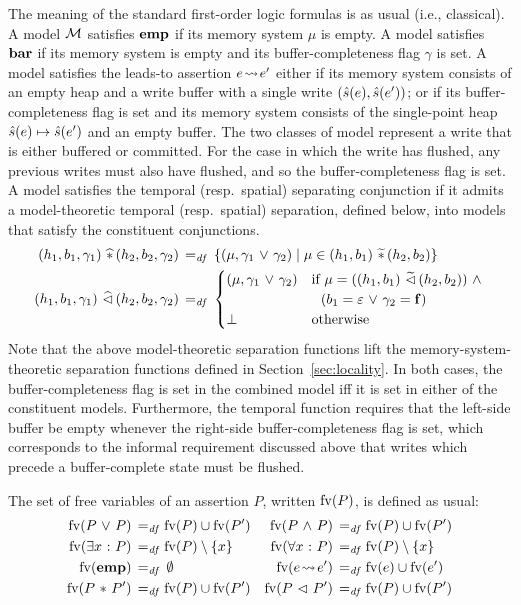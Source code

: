 \documentclass[11pt]{report}         %
\begin{document}
The meaning of the standard first-order logic formulas is as usual (i.e., classical). A model $\mathcal{M}$ satisfies $\mathbf{emp}$ if its memory system $\mu$ is empty. A model satisfies $\mathbf{bar}$ if its memory system is empty and its buffer-completeness flag $\gamma$ is set. A model satisfies the leads-to assertion $e \!\leadsto\! e'$ either if its memory system consists of an empty heap and a write buffer with a single write $(\hat{s}(e), \hat{s}(e'))$; or if its buffer-completeness flag is set and its memory system consists of the single-point heap $\hat{s}(e) \mapsto \hat{s}(e')$ and an empty buffer. The  two classes of model represent a write that is either buffered or committed. For the case in which the write has flushed, any previous writes must also have flushed, and so the buffer-completeness flag is set. A model satisfies the temporal (resp.\ spatial) separating conjunction if it admits a model-theoretic temporal (resp.\ spatial) separation, defined below, into models that satisfy the constituent conjunctions. 
\begin{align*}
  (h_1,b_1,\gamma_1) \operatorname{\,\widehat{\ast}\,} (h_2,b_2,\gamma_2) \operatorname{\;=_{\mathit{df}}\;} & \left\lbrace (\mu,\gamma_1 \operatorname{\,\vee\,} \gamma_2) \mid \mu \in (h_1,b_1) \operatorname{\,\widetilde{\ast}\,} (h_2,b_2) \right\rbrace \\ 
  (h_1,b_1,\gamma_1) \operatorname{\,\widehat{\vartriangleleft}\,} (h_2,b_2,\gamma_2) \operatorname{\;=_{\mathit{df}}\;} & \begin{cases}
  (\mu,\gamma_1 \operatorname{\,\vee\,} \gamma_2) & \text{if $\mu = ((h_1,b_1) \operatorname{\,\widetilde{\vartriangleleft}\,} (h_2,b_2)) \operatorname{\,\wedge\,}$} \\ 
  &  \text{~~$(b_1 = \varepsilon \operatorname{\,\vee\,} \gamma_2 = \mathbf{f})$} \\ 
  \bot & \text{otherwise}
  \end{cases}
\end{align*}
Note that the above model-theoretic separation functions lift the memory-system-theoretic separation functions defined in Section~\ref{sec:locality}. In both cases, the buffer-completeness flag is set in the combined model iff it is set in either of the constituent models. Furthermore, the temporal function requires that the left-side buffer be empty whenever the right-side buffer-completeness flag is set, which corresponds to the informal requirement discussed above that writes which precede a buffer-complete state must be flushed. 


The set of free variables of an assertion $P$, written $\mathrm{fv}(P)$, is defined as usual: \begin{align*}
    \mathrm{fv}(P \operatorname{\,\vee\,} P) \operatorname{\;=_{\mathit{df}}\;} & \mathrm{fv}(P) \cup \mathrm{fv}(P') & \mathrm{fv}(P \operatorname{\,\wedge\,} P) \operatorname{\;=_{\mathit{df}}\;} & \mathrm{fv}(P) \cup \mathrm{fv}(P') \\ 
    \mathrm{fv}(\exists x \operatorname{\,:\,} P) \operatorname{\;=_{\mathit{df}}\;} &\mathrm{fv}(P) \setminus \left\lbrace x \right\rbrace & \mathrm{fv}(\forall x \operatorname{\,:\,} P) \operatorname{\;=_{\mathit{df}}\;} &\mathrm{fv}(P) \setminus \left\lbrace x \right\rbrace \\
    \mathrm{fv}(\mathbf{emp}) \operatorname{\;=_{\mathit{df}}\;} & \operatorname{\emptyset} &  \mathrm{fv}(e \!\leadsto\! e') \operatorname{\;=_{\mathit{df}}\;} & \mathrm{fv}(e) \cup \mathrm{fv}(e') \\
    \mathrm{fv}(P \operatorname{\,\ast\,} P') \operatorname{\;=_{\mathit{df}}\;} & \mathrm{fv}(P) \cup \mathrm{fv}(P') & 
    \mathrm{fv}(P \operatorname{\,\vartriangleleft\,} P') \operatorname{\;=_{\mathit{df}}\;} & \mathrm{fv}(P) \cup \mathrm{fv}(P') 
\end{align*}
\end{document}
